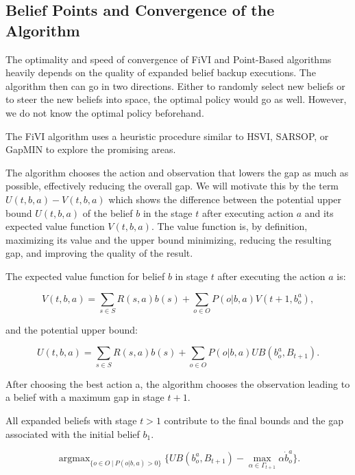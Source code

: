 \subsection{Belief Points and Convergence of the Algorithm}

The optimality and speed of convergence of FiVI and Point-Based algorithms heavily depends on the quality of expanded belief backup executions. The algorithm then can go in two directions. Either to randomly select new beliefs or to steer the new beliefs into space, the optimal policy would go as well. However, we do not know the optimal policy beforehand.

The FiVI algorithm uses a heuristic procedure similar to HSVI, SARSOP, or GapMIN to explore the promising areas. 

The algorithm chooses the action and observation that lowers the gap as much as possible, effectively reducing the overall gap. We will motivate this by the term $U(t, b, a) - V(t, b, a)$ which shows the difference between the potential upper bound $U(t, b, a)$ of the belief $b$ in the stage $t$ after executing action $a$ and its expected value function $V(t, b, a)$. The value function is, by definition, maximizing its value and the upper bound minimizing, reducing the resulting gap, and improving the quality of the result.

The expected value function for belief $b$ in stage $t$ after executing the action $a$ is:

\begin{equation}
    V(t, b, a) = \sum_{s \in S} R(s, a) b(s) + \sum_{o \in O} P(o|b, a) V(t + 1, b^a_o),
\end{equation}

and the potential upper bound:

\begin{equation}
    U(t, b, a) = \sum_{s \in S} R(s, a) b(s) + \sum_{o \in O} P(o|b, a) UB(b^a_o, B_{t+1}).
\end{equation}

After choosing the best action a, the algorithm chooses the observation leading to a belief with a maximum gap in stage $t + 1$.

All expanded beliefs with stage $t > 1$ contribute to the final bounds and the gap associated with the initial belief $b_1$.

\begin{equation}
    \operatorname{argmax}_{\{o \in O\ |\ P(o|b, a) > 0\}} \{UB(b^a_o, B_{t + 1}) - \operatorname{max}_{\alpha \in \Gamma_{t + 1}} \alpha \dot b^a_o \}.
\end{equation}

